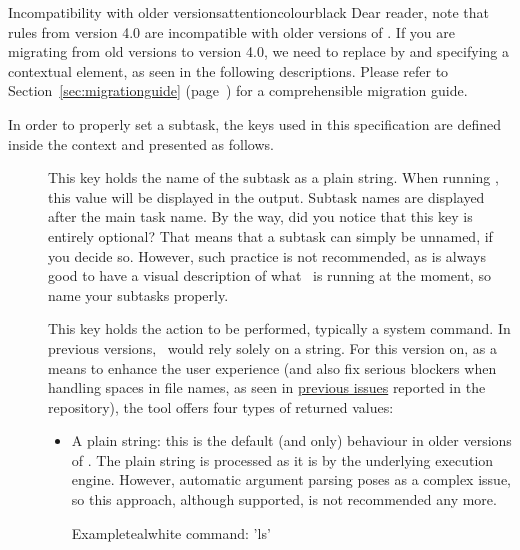 \begin{description}
\begin{messagebox}{Incompatibility with older versions}{attentioncolour}{\icerror}{black}
Dear reader, note that rules from version 4.0 are incompatible with older versions of \arara. If you are migrating from old versions to version 4.0, we need to replace  by  and specifying a contextual element, as seen in the following descriptions. Please refer to Section~\ref{sec:migrationguide} (page~\pageref{sec:migrationguide}) for a comprehensible migration guide.
\end{messagebox}

In order to properly set a subtask, the keys used in this specification are defined inside the  context and presented as follows.

\begin{description}
\item[] This key holds the name of the subtask as a plain string. When running \arara, this value will be displayed in the output. Subtask names are displayed after the main task name. By the way, did you notice that this key is entirely optional? That means that a subtask can simply be unnamed, if you decide so. However, such practice is not recommended, as is always good to have a visual description of what \arara\ is running at the moment, so name your subtasks properly.

\item[] This key holds the action to be performed, typically a system command. In previous versions, \arara\ would rely solely on a string. For this version on, as a means to enhance the user experience (and also fix serious blockers when handling spaces in file names, as seen in \href{https://github.com/cereda/arara/issues}{previous issues} reported in the repository), the tool offers four types of returned values:

\begin{itemize}[label={--}]
\item A plain string: this is the default (and only) behaviour in older versions of \arara. The plain string is processed as it is by the underlying execution engine. However, automatic argument parsing poses as a complex issue, so this approach, although supported, is not recommended any more.

\begin{codebox}{Example}{teal}{\icnote}{white}
command: 'ls'
\end{codebox}


\end{itemize}
\end{description}
\end{description}
